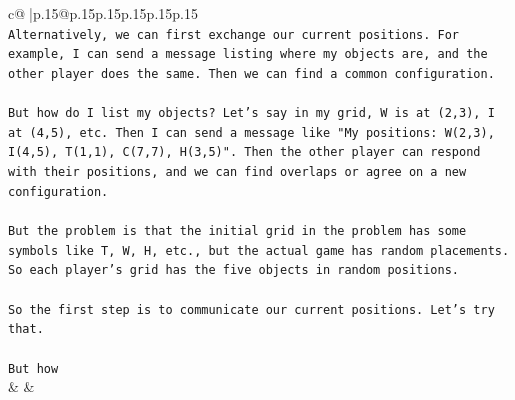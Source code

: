 \documentclass{article}
\begin{document}
{\begin{supertabular}{c@{$\;$}|p{.15\linewidth}@{}p{.15\linewidth}p{.15\linewidth}p{.15\linewidth}p{.15\linewidth}p{.15\linewidth}}
{{{\\ 
\texttt{Alternatively, we can first exchange our current positions. For example, I can send a message listing where my objects are, and the other player does the same. Then we can find a common configuration. } \\
\\ 
\texttt{But how do I list my objects? Let's say in my grid, W is at (2,3), I at (4,5), etc. Then I can send a message like "My positions: W(2,3), I(4,5), T(1,1), C(7,7), H(3,5)". Then the other player can respond with their positions, and we can find overlaps or agree on a new configuration. } \\
\\ 
\texttt{But the problem is that the initial grid in the problem has some symbols like T, W, H, etc., but the actual game has random placements. So each player's grid has the five objects in random positions. } \\
\\ 
\texttt{So the first step is to communicate our current positions. Let's try that. } \\
\\ 
\texttt{But how} \\
            }
        }
    }
    & & \\ \\


\end{supertabular}}
\end{document}
